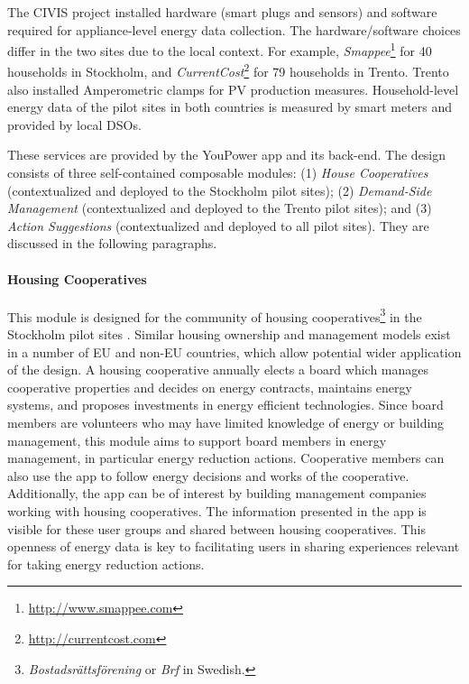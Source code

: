  The CIVIS project installed hardware (smart plugs and sensors) and
software required for appliance-level energy data collection. The hardware/software choices differ in the
two sites due to the local context. For example, \textit{Smappee}\footnote{\url{http://www.smappee.com}}
for 40 households in Stockholm, and \textit{CurrentCost}\footnote{\url{http://currentcost.com}} for 79
households in Trento. Trento also installed Amperometric clamps for PV production measures. 
Household-level energy data of the pilot sites in both countries is measured by smart meters and provided by local DSOs. 

 These services are provided by the YouPower
app and its back-end. The design consists of three self-contained
composable modules: (1) \textit{House Cooperatives} (contextualized and deployed to the Stockholm pilot sites);
(2) \textit{Demand-Side Management} (contextualized and deployed
to the Trento pilot sites); and (3) \textit{Action Suggestions} (contextualized and deployed to all pilot sites).
They are discussed in the following paragraphs. 

\paragraph{Housing Cooperatives}
\label{sect:brf}

This module is designed for the community of housing cooperatives\footnote{\textit{Bostadsr{\"a}ttsf{\"o}rening} or \textit{Brf} in Swedish.} in the Stockholm pilot sites \cite{Hasselqvist2016}.
Similar housing ownership and management models exist in a number of EU and non-EU countries, which allow potential wider application of the design.
A housing cooperative annually elects a board which manages cooperative properties and decides on energy contracts, maintains energy systems, and proposes investments in energy efficient technologies. Since board members are volunteers who may have limited knowledge of energy or building management, this module aims to support board members in energy management, in particular energy reduction actions. Cooperative members can also use the app to follow energy decisions and works of the cooperative. Additionally, the app can be of interest by building management companies working with housing cooperatives. 
The information presented in the app is visible for these user
groups and shared between housing cooperatives. This openness of energy data is key to
facilitating  users in sharing experiences relevant for taking energy reduction actions.

